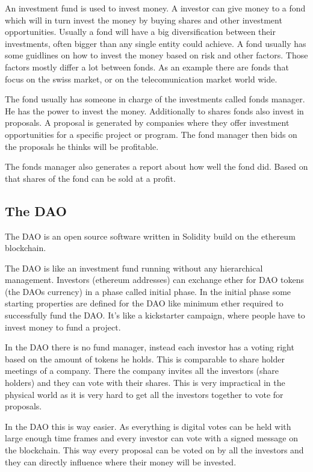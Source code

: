 \documentclass[a4paper, 11pt]{scrartcl}
\begin{document}
An investment fund is used to invest money. A investor can give money to a fond which will in turn invest the money by buying shares and other investment opportunities. Usually a fond will have a big diversification between their investments, often bigger than any single entity could achieve. A fond usually has some guidlines on how to invest the money based on risk and other factors. Those factors mostly differ a lot between fonds. As an example there are fonds that focus on the swiss market, or on the telecomunication market world wide. \cite{fond}

The fond usually has someone in charge of the investments called fonds manager. He has the power to invest the money. Additionally to shares fonds also invest in proposals. A proposal is generated by companies where they offer investment opportunities for a specific project or program. The fond manager then bids on the proposals he thinks will be profitable. \cite{proposal}

The fonds manager also generates a report about how well the fond did. Based on that shares of the fond can be sold at a profit. 

\subsection{The DAO}

The DAO is an open source software written in Solidity build on the ethereum blockchain.

The DAO is like an investment fund running without any hierarchical management.
Investors (ethereum addresses) can exchange ether for DAO tokens (the DAOs currency) in a phase called initial phase. In the initial phase some starting properties are defined for the DAO like minimum ether required to successfully fund the DAO. It's like a kickstarter campaign, where people have to invest money to fund a project.

In the DAO there is no fund manager, instead each investor has a voting right based on the amount of tokens he holds. This is comparable to share holder meetings of a company. There the company invites all the investors (share holders) and they can vote with their shares. This is very impractical in the physical world as it is very hard to get all the investors together to vote for proposals. 

In the DAO this is way easier. As everything is digital votes can be held with large enough time frames and every investor can vote with a signed message on the blockchain. This way every proposal can be voted on by all the investors and they can directly influence where their money will be invested. 
\end{document}
